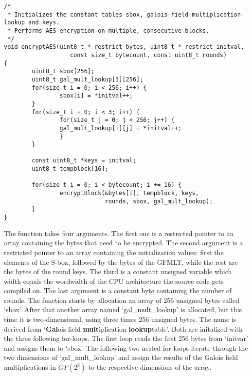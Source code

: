 \begin{lstlisting}
/*
 * Initializes the constant tables sbox, galois-field-multiplication-lookup and keys.
 * Performs AES-encryption on multiple, consecutive blocks.
 */
void encryptAES(uint8_t * restrict bytes, uint8_t * restrict initval, 
                   const size_t bytecount, const uint8_t rounds)
{   
        uint8_t sbox[256];
        uint8_t gal_mult_lookup[3][256];
        for(size_t i = 0; i < 256; i++) {
                sbox[i] = *initval++;
        }
        for(size_t i = 0; i < 3; i++) {
                for(size_t j = 0; j < 256; j++) {
                gal_mult_lookup[i][j] = *initval++;
                }
        }
        
        const uint8_t *keys = initval;
        uint8_t tempblock[16];
        
        for(size_t i = 0; i < bytecount; i += 16) {
                encryptBlock(&bytes[i], tempblock, keys, 
                             rounds, sbox, gal_mult_lookup);
        }
}
\end{lstlisting}

The function takes four arguments. The first one is a restricted pointer
to an array containing the bytes that need to be encrypted. The second
argument is a restricted pointer to an array containing the
initialization values: first the elements of the S-box, followed by the
bytes of the GFMLT, while the rest are the bytes of the round keys. The
third is a constant unsigned variable which width equals the wordwidth
of the CPU architecture the source code gets compiled on. The last
argument is a constant byte containing the number of rounds. The
function starts by allocation an array of 256 unsigned bytes called
`sbox'. After that another array named `gal\_mult\_lookup' is allocated,
but this time it is two-dimensional, using three times 256 unsigned
bytes. The name is derived from `\textbf{Gal}ois field
\textbf{mult}iplication \textbf{lookup}table'. Both are initalized with
the three following for-loops. The first loop reads the first 256 bytes
from `initvar' and assigns them to `sbox'. The following two nested
for-loops iterate through the two dimensions of `gal\_mult\_lookup' and
assign the results of the Galois field multiplications in $GF(2^{8})$ to the
respective dimensions of the array.

